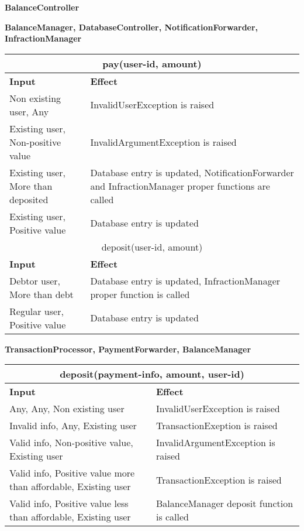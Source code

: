 \begin{Large}
\textbf{BalanceController}
\end{Large}

\textbf{BalanceManager, DatabaseController, NotificationForwarder, InfractionManager} \\
\begin{tabular}{|p{5cm}|p{7cm}|}
\hline
\multicolumn{2}{|c|}{pay(user-id, amount)} \\
\hline
\textbf{Input} & \textbf{Effect} \\

\hline
Non existing user, Any & InvalidUserException is raised \\

\hline
Existing user, Non-positive value & InvalidArgumentException is raised \\

\hline
Existing user, More than deposited & Database entry is updated, NotificationForwarder and InfractionManager proper functions are called \\

\hline
Existing user, Positive value & Database entry is updated \\

\hline
\multicolumn{2}{|c|}{deposit(user-id, amount)} \\
\hline
\textbf{Input} & \textbf{Effect} \\

\hline
Debtor user, More than debt & Database entry is updated, InfractionManager proper function is called \\

\hline
Regular user, Positive value & Database entry is updated \\
\hline
\end{tabular}

\textbf{TransactionProcessor, PaymentForwarder, BalanceManager} \\
\begin{tabular}{|p{5cm}|p{7cm}|}
\hline
\multicolumn{2}{|c|}{deposit(payment-info, amount, user-id)} \\
\hline
\textbf{Input} & \textbf{Effect} \\

\hline
Any, Any, Non existing user & InvalidUserException is raised \\

\hline
Invalid info, Any, Existing user & TransactionExeption is raised \\

\hline
Valid info, Non-positive value, Existing user & InvalidArgumentException is raised\\

\hline
Valid info, Positive value more than affordable, Existing user & TransactionException is raised\\

\hline
Valid info, Positive value less than affordable, Existing user & BalanceManager deposit function is called \\
\hline
\end{tabular}
